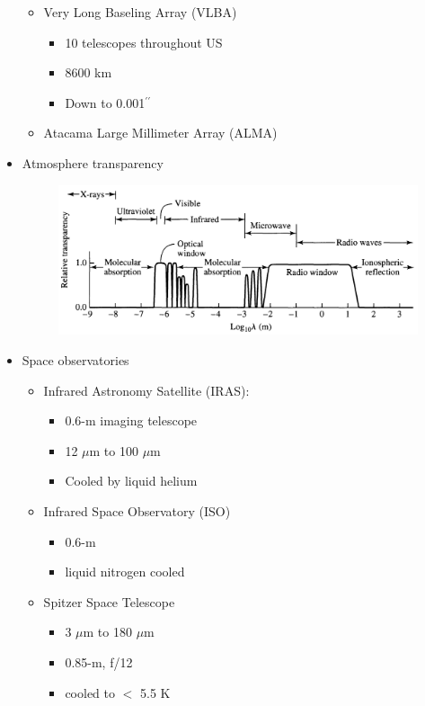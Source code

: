 \documentclass[12pt]{article}
\begin{document}
\begin{itemize}
\begin{itemize}
\begin{itemize}
\end{itemize}
\item Very Long Baseling Array (VLBA)
\begin{itemize}
\item 10 telescopes throughout US
\item 8600 km
\item Down to 0.001$^{\prime\prime}$
\end{itemize}
\item Atacama Large Millimeter Array (ALMA)
\end{itemize}
\item Atmosphere transparency 
\begin{figure}[h!]
\centering
\includegraphics[width=6in]{CandOfigs/atmosphere_transparency.png}
\end{figure}
\item Space observatories
\begin{itemize}
\item Infrared Astronomy Satellite (IRAS): 
\begin{itemize}
\item 0.6-m imaging telescope
\item 12 $\mu$m to 100 $\mu$m
\item Cooled by liquid helium
\end{itemize}
\item Infrared Space Observatory (ISO)
\begin{itemize}
\item 0.6-m
\item liquid nitrogen cooled
\end{itemize}
\item Spitzer Space Telescope
\begin{itemize}
\item 3 $\mu$m to 180 $\mu$m
\item 0.85-m, f/12
\item cooled to $<$ 5.5 K
\end{itemize}

\end{itemize}
\end{itemize}
\end{document}
